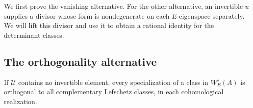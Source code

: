 We first prove the vanishing alternative.  For the other alternative,
an invertible $u$ supplies a divisor whose form is nondegenerate on
each $E$-eigenspace separately.  We will lift this divisor and use it
to obtain a rational identity for the determinant classes.

\subsection{The orthogonality alternative}

\begin{lemma}\label{lem:weil-orthogonality}
If $\mathcal U$ contains no invertible element, every specialization of
a class in $W_E^s(A)$ is orthogonal to all complementary Lefschetz
classes, in each cohomological realization.
\end{lemma}


